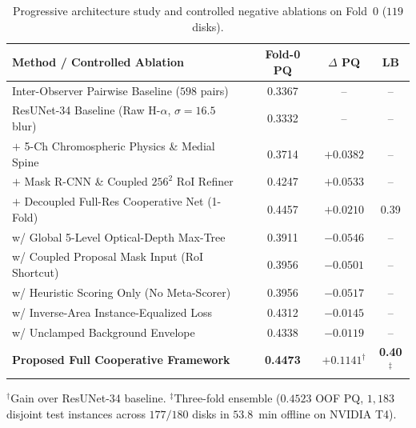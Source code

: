 \documentclass[sigconf]{acmart}
\begin{document}
\begin{table}[b]
    \vspace{-6pt}
    \caption{Progressive architecture study and controlled negative ablations on Fold~0 ($119$ disks).}
    \vspace{-8pt}
    \label{tab:ablations}
    \centering
    \scriptsize
    \setlength{\tabcolsep}{2.8pt}
    \begin{tabularx}{\columnwidth}{Xccc}
        \toprule
        \textbf{Method / Controlled Ablation} & \textbf{Fold-0 PQ} & \textbf{$\Delta$ PQ} & \textbf{LB} \\
        \midrule
        Inter-Observer Pairwise Baseline ($598$ pairs) & 0.3367 & -- & -- \\
        ResUNet-34 Baseline (Raw H-$\alpha$, $\sigma{=}16.5$ blur) & 0.3332 & -- & -- \\
        $+$ 5-Ch Chromospheric Physics \& Medial Spine & 0.3714 & $+0.0382$ & -- \\
        $+$ Mask R-CNN \& Coupled $256^2$ RoI Refiner & 0.4247 & $+0.0533$ & -- \\
        $+$ Decoupled Full-Res Cooperative Net (1-Fold) & 0.4457 & $+0.0210$ & 0.39 \\
        \midrule
        w/ Global 5-Level Optical-Depth Max-Tree & 0.3911 & $-0.0546$ & -- \\
        w/ Coupled Proposal Mask Input (RoI Shortcut) & 0.3956 & $-0.0501$ & -- \\
        w/ Heuristic Scoring Only (No Meta-Scorer) & 0.3956 & $-0.0517$ & -- \\
        w/ Inverse-Area Instance-Equalized Loss & 0.4312 & $-0.0145$ & -- \\
        w/ Unclamped Background Envelope & 0.4338 & $-0.0119$ & -- \\
        \midrule
        \textbf{Proposed Full Cooperative Framework} & \textbf{0.4473} & \textbf{$+0.1141^\dagger$} & \textbf{0.40}$^\ddagger$ \\
        \bottomrule
    \end{tabularx}
    \vspace{1pt}
    {\raggedright\scriptsize $^\dagger$Gain over ResUNet-34 baseline. $^\ddagger$Three-fold ensemble ($0.4523$ OOF PQ, $1{,}183$ disjoint test instances across $177/180$ disks in $53.8$~min offline on NVIDIA T4).\par}
\end{table}
\end{document}
